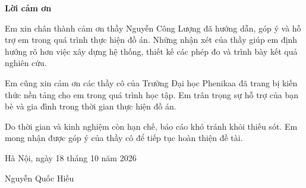 
\begin{center}
    \Large{\textbf{Lời cảm ơn}}
\end{center}
\vspace{1cm}

Em xin chân thành cảm ơn thầy Nguyễn Công Lượng đã hướng dẫn, góp ý và hỗ trợ em trong quá trình thực hiện đồ án. Những nhận xét của thầy giúp em định hướng rõ hơn việc xây dựng hệ thống, thiết kế các phép đo và trình bày kết quả nghiên cứu.

Em cũng xin cảm ơn các thầy cô của Trường Đại học Phenikaa đã trang bị kiến thức nền tảng cho em trong quá trình học tập. Em trân trọng sự hỗ trợ của bạn bè và gia đình trong thời gian thực hiện đồ án.

Do thời gian và kinh nghiệm còn hạn chế, báo cáo khó tránh khỏi thiếu sót. Em mong nhận được góp ý của thầy cô để tiếp tục hoàn thiện đề tài.

\vspace{1cm}
\hfill Hà Nội, ngày 18 tháng 10 năm 2026

\vspace{1cm}
\hfill Nguyễn Quốc Hiếu

